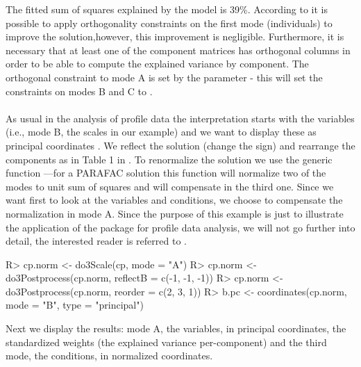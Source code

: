 \documentclass[article,shortnames, nojss]{jss}
\begin{document}
The fitted sum of squares explained by the model is 39\%.
According to \cite{kroonenberg:2008} it is possible
to apply orthogonality constraints on the first mode (individuals) to
improve the solution,however, this improvement is negligible. Furthermore,
it is necessary that at least one of the component matrices has
orthogonal columns in order to be able to compute the explained
variance by component. The orthogonal constraint to mode A is set by the
parameter  - this will set the constraints
on modes B and C to .\\\\
As usual in the analysis of profile data the interpretation starts with
the variables (i.e., mode B, the scales in our example) and we want to
display these as principal coordinates \citep[see][9.4, page 219]{kroonenberg:2008}.
We reflect the solution (change the sign) and rearrange the components as in
Table 1 in \cite{kroonenberg:2009}. To renormalize the solution we use the generic
function ---for a PARAFAC solution this function will normalize two
of the modes to unit sum of squares and will compensate in the third one. Since we
want first to look at the variables and conditions, we choose to compensate
the normalization in mode A. Since the purpose of this example is just to illustrate the
application of the package  for profile data analysis, we will not go
further into detail, the interested reader is referred to
\cite{kroonenberg:2009}.
\begin{Schunk}
\begin{Sinput}
R> cp.norm <- do3Scale(cp, mode = "A")
R> cp.norm <- do3Postprocess(cp.norm, reflectB = c(-1, -1, -1))
R> cp.norm <- do3Postprocess(cp.norm, reorder = c(2, 3, 1))
R> b.pc <- coordinates(cp.norm, mode = "B", type = "principal")
\end{Sinput}
\end{Schunk}
Next we display the results: mode A, the variables, in principal coordinates,
the standardized weights (the explained variance per-component) and the
third mode, the conditions, in normalized coordinates.
\end{document}
